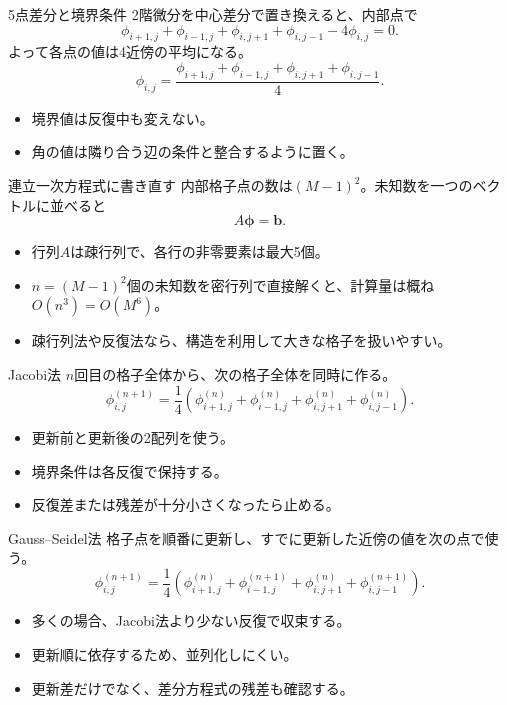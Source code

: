 \documentclass[12pt,aspectratio=43]{beamer}
\begin{document}
\begin{frame}[t]{5点差分と境界条件}
  2階微分を中心差分で置き換えると、内部点で
  \[
    \phi_{i+1,j}+\phi_{i-1,j}+\phi_{i,j+1}+\phi_{i,j-1}-4\phi_{i,j}=0.
  \]
  よって各点の値は4近傍の平均になる。
  \[
    \phi_{i,j}=\frac{\phi_{i+1,j}+\phi_{i-1,j}+\phi_{i,j+1}+\phi_{i,j-1}}{4}.
  \]
  \begin{itemize}
    \item 境界値は反復中も変えない。
    \item 角の値は隣り合う辺の条件と整合するように置く。
  \end{itemize}
\end{frame}

\begin{frame}[t]{連立一次方程式に書き直す}
  内部格子点の数は\((M-1)^2\)。未知数を一つのベクトルに並べると
  \[
    A\boldsymbol{\phi}=\boldsymbol{b}.
  \]
  \begin{itemize}
    \item 行列\(A\)は疎行列で、各行の非零要素は最大5個。
    \item \(n=(M-1)^2\)個の未知数を密行列で直接解くと、計算量は概ね\(O(n^3)=O(M^6)\)。
    \item 疎行列法や反復法なら、構造を利用して大きな格子を扱いやすい。
  \end{itemize}
\end{frame}

\begin{frame}[t]{Jacobi法}
  \(n\)回目の格子全体から、次の格子全体を同時に作る。
  \[
    \phi^{(n+1)}_{i,j}=\frac{1}{4}\left(
    \phi^{(n)}_{i+1,j}+\phi^{(n)}_{i-1,j}
    +\phi^{(n)}_{i,j+1}+\phi^{(n)}_{i,j-1}\right).
  \]
  \begin{itemize}
    \item 更新前と更新後の2配列を使う。
    \item 境界条件は各反復で保持する。
    \item 反復差または残差が十分小さくなったら止める。
  \end{itemize}
\end{frame}

\begin{frame}[t]{Gauss--Seidel法}
  格子点を順番に更新し、すでに更新した近傍の値を次の点で使う。
  \[
    \phi^{(n+1)}_{i,j}=\frac{1}{4}\left(
    \phi^{(n)}_{i+1,j}+\phi^{(n+1)}_{i-1,j}
    +\phi^{(n)}_{i,j+1}+\phi^{(n+1)}_{i,j-1}\right).
  \]
  \begin{itemize}
    \item 多くの場合、Jacobi法より少ない反復で収束する。
    \item 更新順に依存するため、並列化しにくい。
    \item 更新差だけでなく、差分方程式の残差も確認する。
  \end{itemize}
\end{frame}
\end{document}
